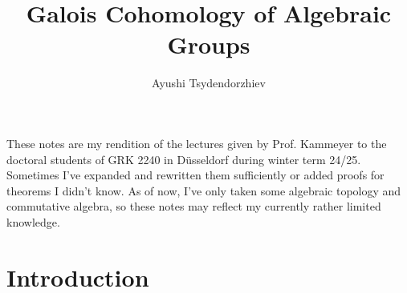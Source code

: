 
\title{Galois Cohomology of Algebraic Groups}
\author[Ayushi Tsydendorzhiev]{Ayushi Tsydendorzhiev}
\usepackage{enumitem}
\usepackage{stmaryrd}
\usepackage{xhfill}
\usepackage{array}
\usepackage{outlines}
\usepackage{faktor}
\usepackage{float}
\usepackage{mathtools}
\usepackage{tikz-cd}
\usepackage{centernot}
\usepackage{cancel}
\newcommand{\ra}{\rightarrow}
\newcommand{\lra}{\longrightarrow}
\newcommand{\eps}{\varepsilon}
\renewcommand{\P}{\mathbb{P}}
\newcommand{\acts}{\curvearrowright}
\newcommand\Gal[1]{\operatorname{Gal}({#1})}
\renewcommand{\phi}{\varphi}
\newcommand\discr[1]{\operatorname{discr}({#1})}
\newcommand{\ch}{\operatorname{char}}
\newcommand{\tr}{\operatorname{tr}}


\maketitle

These notes are my rendition of the lectures given by Prof. Kammeyer to the doctoral students of GRK 2240 in Düsseldorf during winter term 24/25. Sometimes I've expanded and rewritten them sufficiently or added proofs for theorems I didn't know. As of now, I've only taken some algebraic topology and commutative algebra, so these notes may reflect my currently rather limited knowledge. 

\tableofcontents
\clearpage

\section{Introduction}

